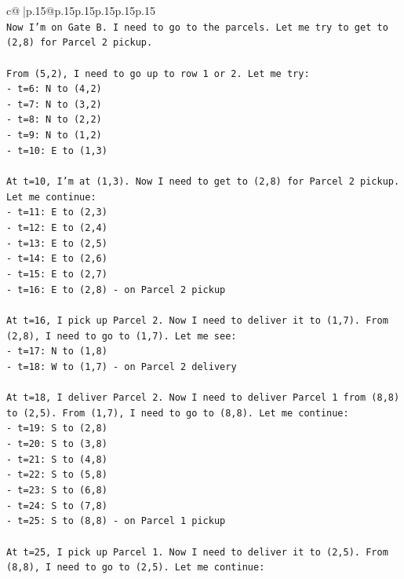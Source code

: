 \documentclass{article}
\begin{document}
{\begin{supertabular}{c@{$\;$}|p{.15\linewidth}@{}p{.15\linewidth}p{.15\linewidth}p{.15\linewidth}p{.15\linewidth}p{.15\linewidth}}
{{{\\ 
\texttt{Now I'm on Gate B. I need to go to the parcels. Let me try to get to (2,8) for Parcel 2 pickup.} \\
\\ 
\texttt{From (5,2), I need to go up to row 1 or 2. Let me try:} \\
\texttt{{-} t=6: N to (4,2)} \\
\texttt{{-} t=7: N to (3,2)} \\
\texttt{{-} t=8: N to (2,2)} \\
\texttt{{-} t=9: N to (1,2)} \\
\texttt{{-} t=10: E to (1,3)} \\
\\ 
\texttt{At t=10, I'm at (1,3). Now I need to get to (2,8) for Parcel 2 pickup. Let me continue:} \\
\texttt{{-} t=11: E to (2,3)} \\
\texttt{{-} t=12: E to (2,4)} \\
\texttt{{-} t=13: E to (2,5)} \\
\texttt{{-} t=14: E to (2,6)} \\
\texttt{{-} t=15: E to (2,7)} \\
\texttt{{-} t=16: E to (2,8) {-} on Parcel 2 pickup} \\
\\ 
\texttt{At t=16, I pick up Parcel 2. Now I need to deliver it to (1,7). From (2,8), I need to go to (1,7). Let me see:} \\
\texttt{{-} t=17: N to (1,8)} \\
\texttt{{-} t=18: W to (1,7) {-} on Parcel 2 delivery} \\
\\ 
\texttt{At t=18, I deliver Parcel 2. Now I need to deliver Parcel 1 from (8,8) to (2,5). From (1,7), I need to go to (8,8). Let me continue:} \\
\texttt{{-} t=19: S to (2,8)} \\
\texttt{{-} t=20: S to (3,8)} \\
\texttt{{-} t=21: S to (4,8)} \\
\texttt{{-} t=22: S to (5,8)} \\
\texttt{{-} t=23: S to (6,8)} \\
\texttt{{-} t=24: S to (7,8)} \\
\texttt{{-} t=25: S to (8,8) {-} on Parcel 1 pickup} \\
\\ 
\texttt{At t=25, I pick up Parcel 1. Now I need to deliver it to (2,5). From (8,8), I need to go to (2,5). Let me continue:} \\
}}}
\end{supertabular}}
\end{document}

